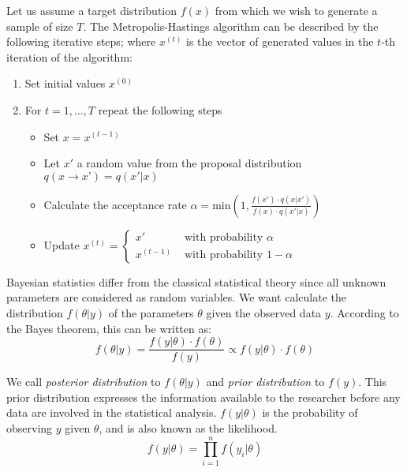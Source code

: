 \documentclass[11pt,fleqn]{book} %
\begin{document}
\begin{algorithm}
Let us assume a target distribution $f(x)$ from which we wish to generate a 
sample of size $T$. The Metropolis-Hastings algorithm can be described by the 
following iterative steps; where $x^{(t)}$ is the vector of generated values 
in the $t$-th iteration of the algorithm:
\begin{enumerate}
\item Set initial values $x^{(0)}$
\item For $t=1,\dots,T$ repeat the following steps
\begin{itemize}
\item Set $x=x^{(t-1)}$
\item Let $x'$ a random value from the proposal distribution $q(x \to x’)=q(x'|x)$
\item Calculate the acceptance rate 
      $\alpha = \textrm{min}\left(1,\frac{f(x') \cdot q(x|x')}{f(x) \cdot q(x'|x)}\right)$
\item Update $x^{(t)}=\left\{
  \begin{array}{ll}
  x' & \textrm{ with probability } \alpha \\
  x^{(t-1)}  & \textrm{ with probability } 1-\alpha
  \end{array}\right.$ 
\end{itemize}
\end{enumerate}
\end{algorithm}



Bayesian statistics differ from the classical statistical theory since all 
unknown parameters are considered as random variables.
We want calculate the distribution $f(\theta|y)$ of the parameters $\theta$ 
given the observed data $y$. According to the Bayes theorem, this can be 
written as:
\begin{displaymath}
f(\theta|y) = \frac{f(y|\theta) \cdot f(\theta)}{f(y)} \propto f(y|\theta) \cdot f(\theta)
\end{displaymath}

We call \emph{posterior distribution} to $f(\theta|y)$ and \emph{prior distribution} 
to $f(y)$. This prior distribution expresses the information available to the 
researcher before any data are involved in the statistical analysis. 
$f(y|\theta)$ is the probability of observing $y$ given $\theta$, and is also 
known as the likelihood.
\begin{displaymath}
f(y|\theta) = \prod_{i=1}^n f(y_i|\theta)
\end{displaymath}
\end{document}
